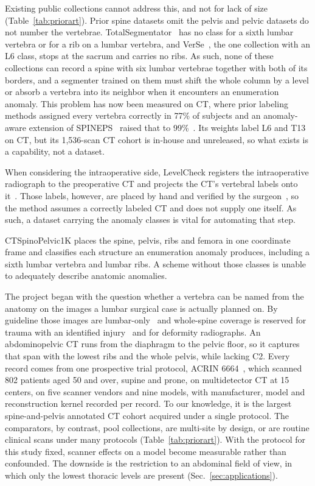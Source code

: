 \documentclass[aapm,mph,amsmath,amssymb,reprint]{revtex4-2}
\begin{document}
Existing public collections cannot address this, and not for lack of size
(Table~\ref{tab:priorart}). Prior spine datasets omit the pelvis and pelvic datasets do not number
the vertebrae. TotalSegmentator~\cite{totalsegmentator} has no class for a sixth lumbar vertebra or for a rib on a
lumbar vertebra, and VerSe~\cite{verse2021}, the one collection with an L6 class, stops at the sacrum and
carries no ribs. As such, none of these collections can record a spine with six lumbar vertebrae together with both of its
borders, and a segmenter trained on them must shift the
whole column by a level or absorb a vertebra into its neighbor when it encounters an enumeration anomaly. This problem has now been measured
on CT, where prior labeling methods assigned every vertebra correctly in 77\% of subjects and
an anomaly-aware extension of SPINEPS~\cite{spineps2025} raised that to
99\%~\cite{veridah2026}. Its weights label L6 and T13 on CT, but its 1{,}536-scan CT cohort is in-house and
unreleased, so what exists is a capability, not a dataset. 

When considering the intraoperative side, LevelCheck registers the intraoperative
radiograph to the preoperative CT and projects the CT's vertebral labels onto
it~\cite{otake2012,lo2015,desilva2016}. Those labels, however, are placed by hand and verified by
the surgeon~\cite{otake2012}, so the method assumes a correctly labeled CT and does not supply
one itself. As such, a dataset carrying the anomaly classes is vital for automating that step.

CTSpinoPelvic1K places the spine, pelvis, ribs and femora in one coordinate frame and classifies each structure an enumeration anomaly produces, including a sixth lumbar vertebra and lumbar ribs. A scheme without those classes is unable to adequately describe anatomic anomalies.

The project began with the question whether a vertebra can be named from the anatomy on the images a lumbar surgical case is actually planned on. By guideline those images are lumbar-only~\cite{acr2021,nass2013,acrct2022,acrmri2023} and whole-spine coverage is reserved for trauma with an identified
injury~\cite{sixta2012,tqip2018} and for deformity
radiographs. An abdominopelvic CT runs from the diaphragm to the pelvic floor, so it captures
that span with the lowest ribs and the whole pelvis, while lacking C2. Every record
comes from one prospective trial protocol, ACRIN 6664~\cite{colonog,tcia}, which scanned 802 patients aged 50 and over, supine and prone, on multidetector CT at 15 centers, on five scanner
vendors and nine models, with manufacturer, model and reconstruction kernel recorded per
record. To our knowledge, it is the largest spine-and-pelvis annotated CT cohort acquired under a
single protocol. The comparators, by contrast, pool collections, are multi-site by design, or are
routine clinical scans under many protocols (Table~\ref{tab:priorart}). With the protocol for this study fixed, scanner effects on a model become measurable rather than confounded. The downside is the restriction to an abdominal field of view, in which only the lowest thoracic levels are present
(Sec.~\ref{sec:applications}).
\end{document}
